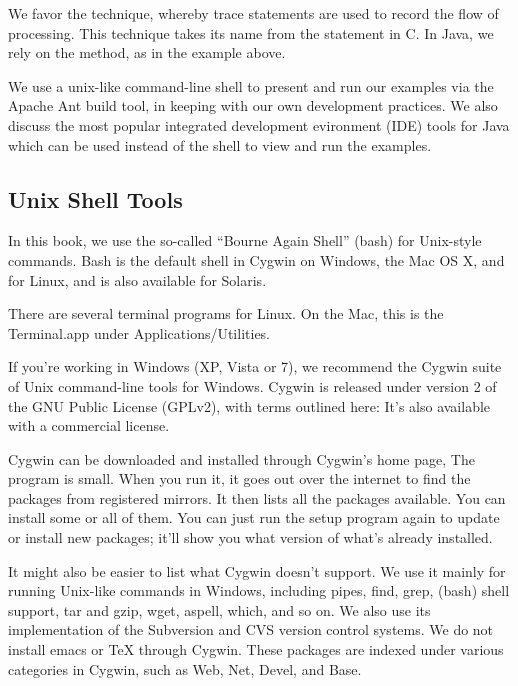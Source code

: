 We favor the  technique, 
whereby trace statements are used to record the flow of processing.
This technique takes its name from the  statement in C.
In Java, we rely on the  method,
as in the  example above.

We use a unix-like command-line shell to present and run our examples
via the Apache Ant build tool, in keeping with our own development
practices.  We also discuss the most popular integrated
development evironment (IDE) tools for Java which can be used
instead of the shell to view and run the examples.

\subsection{Unix Shell Tools}

In this book, we use the so-called ``Bourne Again Shell'' (bash) for
Unix-style commands.  Bash is the default shell in Cygwin on Windows,
the Mac OS X, and for Linux, and is also available for Solaris.

There are several terminal programs for Linux.
On the Mac, this is the Terminal.app under Applications/Utilities.

If you're working in Windows (XP, Vista or 7), we recommend the 
Cygwin suite of Unix command-line tools for Windows.  
Cygwin is released under version 2 of the GNU Public License (GPLv2), with
terms outlined here:
%
%
It's also available with a commercial license.

Cygwin can be downloaded and installed through Cygwin's home page,
%
%
The  program is small.  When you run it, it goes out
over the internet to find the packages from registered mirrors.  It
then lists all the packages available.  You can install some or all of
them.  You can just run the setup program again to update or install
new packages; it'll show you what version of what's already installed.

It might also be easier to list what Cygwin doesn't support.  We use
it mainly for running Unix-like commands in Windows, including pipes,
find, grep, (bash) shell support, tar and gzip, wget, aspell, which,
and so on.  We also use its implementation of the Subversion and CVS
version control systems.  We do not install emacs or TeX through
Cygwin.  These packages are indexed under various categories in
Cygwin, such as Web, Net, Devel, and Base.  

